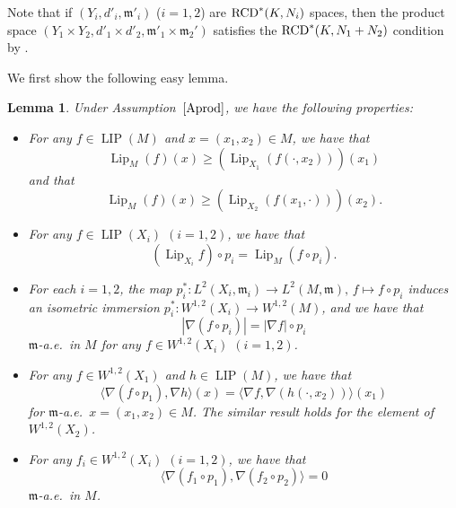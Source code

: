 \documentclass[10pt,a4paper]{amsart}
\numberwithin{equation}{section}
\newtheorem{Lem}[Thm]{Lemma}
\theoremstyle{definition}
\newcommand{\LIP}{\operatorname{LIP}}
\newcommand{\Lip}{\operatorname{Lip}}
\newcommand{\mf}{\mathfrak{m}}
\newcommand{\RCD}{{\rm RCD}^\ast}
\begin{document}
Note that if $(Y_i,d'_i,\mf'_i)$ ($i=1,2$) are $\RCD(K,N_i)$ spaces, then the product space
$(Y_1\times Y_2,\allowbreak d'_1\times d'_2,\mf'_1\times \mf_2')$ satisfies the $\RCD(K,N_1+N_2)$ condition by \cite[Theorem~3.23]{EKS}.

We first show the following easy lemma.
\begin{Lem}\label{prsb}
Under Assumption~$\ref{Aprod}$, we have the following properties:
\begin{itemize}\itemsep=0pt
\item[$(i)$] For any $f\in \LIP(M)$ and $x=(x_1,x_2)\in M$, we have that
\[
\Lip_M(f)(x)\geq \left(\Lip_{X_1} (f(\cdot,x_2))\right)(x_1)
\]
and that
\[
\Lip_M(f)(x)\geq \left(\Lip_{X_2} (f(x_1,\cdot))\right)(x_2).
\]
\item[$(ii)$] For any $f\in \LIP(X_i)$ $(i=1,2)$, we have that
\[
(\Lip_{X_i} f)\circ p_i=\Lip_M (f\circ p_i).
\]
\item[$(iii)$] For each $i=1,2$, the map $p_i^\ast\colon L^2(X_i,\mf_i)\to L^2(M,\mf),\,f\mapsto f\circ p_i$ induces an isometric immersion $p_i^\ast \colon W^{1,2}(X_i)\to W^{1,2}(M)$,
and we have that
\[
|\nabla (f\circ p_i)|=|\nabla f|\circ p_i
\]
$\mf$-a.e.\ in $M$ for any $f\in W^{1,2}(X_i)$ $(i=1,2)$.
\item[$(iv)$] For any $f\in W^{1,2}(X_1)$ and $h\in \LIP(M)$, we have that
\[
\langle\nabla (f\circ p_1),\nabla h\rangle(x)=\langle\nabla f,\nabla (h(\cdot,x_2))\rangle(x_1)
\]
for $\mf$-a.e.\ $x=(x_1,x_2)\in M$.
The similar result holds for the element of $W^{1,2}(X_2)$.
\item[$(v)$] For any $f_i\in W^{1,2}(X_i)$ $(i=1,2)$, we have that
\[
\langle\nabla (f_1\circ p_1),\nabla (f_2\circ p_2)\rangle=0
\]
$\mf$-a.e.\ in $M$.
\end{itemize}
\end{Lem}
\end{document}
